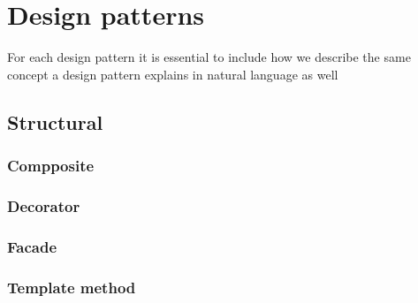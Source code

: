 \chapter{Design patterns}
    For each design pattern it is essential to include how we describe the same concept a design pattern explains in natural language as well
    

\section{Structural}
    
    \subsection{Compposite}
    
    \subsection{Decorator}
    
            
        
    
    \subsection{Facade}
    
    \subsection{Template method}
    

